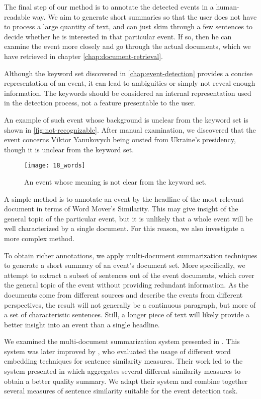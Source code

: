 The final step of our method is to annotate the detected events in a human-readable way. We aim to generate short summaries so that the user does not have to process a large quantity of text, and can just skim through a few sentences to decide whether he is interested in that particular event. If so, then he can examine the event more closely and go through the actual documents, which we have retrieved in chapter \autoref{chap:document-retrieval}.

Although the keyword set discovered in \autoref{chap:event-detection} provides a concise representation of an event, it can lead to ambiguities or simply not reveal enough information. The keywords should be considered an internal representation used in the detection process, not a feature presentable to the user.

An example of such event whose background is unclear from the keyword set is shown in \autoref{fig:not-recognizable}. After manual examination, we discovered that the event concerns Viktor Yanukovych being ousted from Ukraine's presidency, though it is unclear from the keyword set.


\begin{figure}[H]
  \centering
  \texttt{[image: 18\_words]}  %
  \caption{An event whose meaning is not clear from the keyword set.}
  \label{fig:not-recognizable}
\end{figure}


A simple method is to annotate an event by the headline of the most relevant document in terms of Word Mover's Similarity. This may give insight of the general topic of the particular event, but it is unlikely that a whole event will be well characterized by a single document. For this reason, we also investigate a more complex method.

To obtain richer annotations, we apply multi-document summarization techniques to generate a short summary of an event's document set. More specifically, we attempt to extract a subset of sentences out of the event documents, which cover the general topic of the event without providing redundant information. As the documents come from different sources and describe the events from different perspectives, the result will not generally be a continuous paragraph, but more of a set of characteristic sentences. Still, a longer piece of text will likely provide a better insight into an event than a single headline.

We examined the multi-document summarization system presented in \cite{multi-summarization-1, multi-summarization-2}. This system was later improved by \cite{mogren-1}, who evaluated the usage of different word embedding techniques for sentence similarity measures. Their work led to the system presented in \cite{mogren-2} which aggregates several different similarity measures to obtain a better quality summary. We adapt their system and combine together several measures of sentence similarity suitable for the event detection task.


